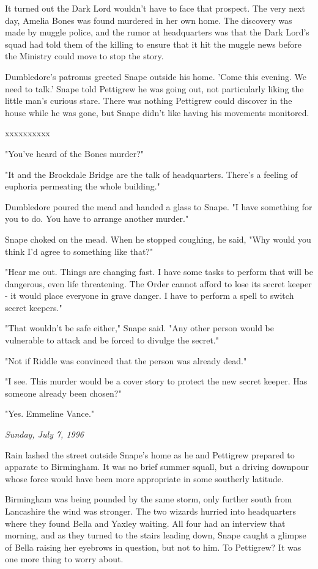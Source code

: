 \documentclass[a4paper,11pt]{article}
\begin{document}
It turned out the Dark Lord wouldn't have to face that prospect. The very next day, Amelia Bones was found murdered in her own home. The discovery was made by muggle police, and the rumor at headquarters was that the Dark Lord's squad had told them of the killing to ensure that it hit the muggle news before the Ministry could move to stop the story.

Dumbledore's patronus greeted Snape outside his home. 'Come this evening. We need to talk.' Snape told Pettigrew he was going out, not particularly liking the little man's curious stare. There was nothing Pettigrew could discover in the house while he was gone, but Snape didn't like having his movements monitored.

xxxxxxxxxx

"You've heard of the Bones murder?"

"It and the Brockdale Bridge are the talk of headquarters. There's a feeling of euphoria permeating the whole building."

Dumbledore poured the mead and handed a glass to Snape. "I have something for you to do. You have to arrange another murder."

Snape choked on the mead. When he stopped coughing, he said, "Why would you think I'd agree to something like that?"

"Hear me out. Things are changing fast. I have some tasks to perform that will be dangerous, even life threatening. The Order cannot afford to lose its secret keeper - it would place everyone in grave danger. I have to perform a spell to switch secret keepers."

"That wouldn't be safe either," Snape said. "Any other person would be vulnerable to attack and be forced to divulge the secret."

"Not if Riddle was convinced that the person was already dead."

"I see. This murder would be a cover story to protect the new secret keeper. Has someone already been chosen?"

"Yes. Emmeline Vance."

\emph{Sunday, July 7, 1996}

Rain lashed the street outside Snape's home as he and Pettigrew prepared to apparate to Birmingham. It was no brief summer squall, but a driving downpour whose force would have been more appropriate in some southerly latitude.

Birmingham was being pounded by the same storm, only further south from Lancashire the wind was stronger. The two wizards hurried into headquarters where they found Bella and Yaxley waiting. All four had an interview that morning, and as they turned to the stairs leading down, Snape caught a glimpse of Bella raising her eyebrows in question, but not to him. To Pettigrew? It was one more thing to worry about.
\end{document}

